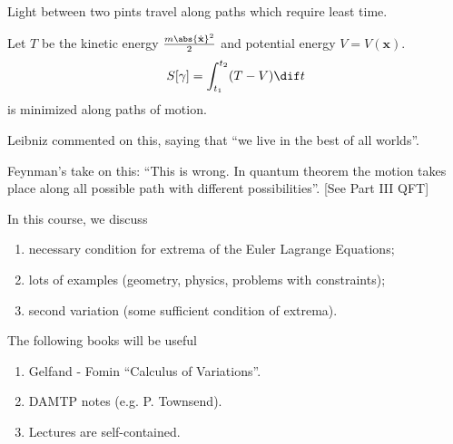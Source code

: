 \begin{example}
    Light between two pints travel along paths which require least time.
\end{example}

\begin{example}
    Let \(T\) be the kinetic energy \(\frac{m \abs{\dot{\mathbf{x}}}^2}{2}\) and potential energy \(V = V(\mathbf{x})\).
    \[
        S[\gamma] = \int_{t_1}^{t_2} (T - V) \dif t
    \]
    is minimized along paths of motion.

    Leibniz commented on this, saying that ``we live in the best of all worlds''.

    Feynman's take on this: ``This is wrong. In quantum theorem the motion takes place along all possible path with different possibilities''. [See Part III QFT]
\end{example}

In this course, we discuss
\begin{enumerate}
    \item necessary condition for extrema of the Euler Lagrange Equations;
    \item lots of examples (geometry, physics, problems with constraints);
    \item second variation (some sufficient condition of extrema).
\end{enumerate}
The following books will be useful
\begin{enumerate}
    \item Gelfand - Fomin ``Calculus of Variations''.
    \item DAMTP notes (e.g. P. Townsend).
    \item Lectures are self-contained.
\end{enumerate}